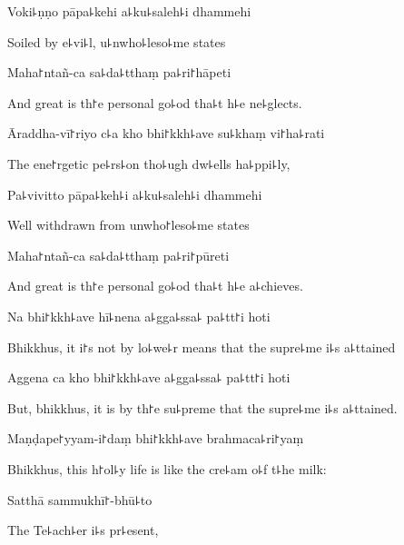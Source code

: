 Voki꜕ṇṇo pāpa꜕kehi a꜕ku꜕saleh꜕i dhammehi

\begin{english}
  Soiled by e꜕vi꜕l, u꜕nwho꜕leso꜕me states
\end{english}

Maha꜓ntañ-ca sa꜕da꜕tthaṃ pa꜕ri꜓hāpeti

\begin{english}
  And great is th꜓e personal go꜕od tha꜕t h꜕e ne꜕glects.
\end{english}

Āraddha-vī꜓riyo c꜕a kho bhi꜓kkh꜕ave su꜕khaṃ vi꜓ha꜕rati

\begin{english}
  The ene꜓rgetic pe꜕rs꜕on tho꜕ugh dw꜕ells ha꜕ppi꜕ly,
\end{english}

Pa꜕vivitto pāpa꜕keh꜕i a꜕ku꜕saleh꜕i dhammehi

\begin{english}
  Well withdrawn from unwho꜓leso꜕me states
\end{english}

Maha꜓ntañ-ca sa꜕da꜕tthaṃ pa꜕ri꜓pūreti

\begin{english}
  And great is th꜓e personal go꜕od tha꜕t h꜕e a꜕chieves.
\end{english}

Na bhi꜓kkh꜕ave hī꜕nena a꜕gga꜕ssa꜕ pa꜕tt꜓i hoti

\begin{english}
  Bhikkhus, it i꜓s not by lo꜕we꜕r means that the supre꜕me i꜕s a꜕ttained
\end{english}

Aggena ca kho bhi꜓kkh꜕ave a꜕gga꜕ssa꜕ pa꜕tt꜓i hoti

\begin{english}
  But, bhikkhus, it is by th꜓e su꜕preme that the supre꜕me i꜕s a꜕ttained.
\end{english}

Maṇḍape꜓yyam-i꜓daṃ bhi꜓kkh꜕ave brahmaca꜕ri꜓yaṃ

\begin{english}
  Bhikkhus, this h꜓ol꜕y life is like the cre꜕am o꜕f t꜕he milk:
\end{english}

Satthā sammukhī꜓-bhū꜕to

\begin{english}
  The Te꜕ach꜕er i꜕s pr꜕esent,
\end{english}

